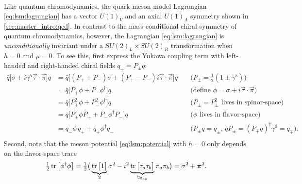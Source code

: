 Like quantum chromodynamics, the quark-meson model Lagrangian \eqref{eq:lsm:lagrangian} has a vector $U(1)_V$ and an axial $U(1)_A$ symmetry shown in \cref{sec:master_intro:qcd}.
In contrast to the mass-conditional chiral symmetry of quantum chromodynamics, however,
the Lagrangian \eqref{eq:lsm:lagrangian} is \emph{unconditionally} invariant under a $SU(2)_L \times SU(2)_R$ transformation when $h=0$ and $\mu = 0$.
To see this, first express the Yukawa coupling term with left-handed and right-handed chiral fields $q_\pm = P_\pm q$:
\begin{equation}
\begin{aligned}
	\bar{q} \big[\sigma + i \gamma^5 \vec{\tau} \cdot \vec{\pi}\big] q &= \bar{q} \big[ (P_+ + P_-) \sigma + (P_+ - P_-) i \vec{\tau} \cdot \vec{\pi}\big] q && \; \big( P_\pm = \tfrac{1}{2} (1 \pm \gamma^5) \big) \\
	                                                           &= \bar{q} \big[ P_+ \phi + P_- \phi^\dagger\big] q && \; \big( \text{define } \phi=\sigma+i\vec{\tau}\cdot\vec{\pi} \big) \\
	                                                           &= \bar{q} \big[ P_+^2 \phi + P_-^2 \phi^\dagger\big] q && \; \big( \text{$P_\pm=P_\pm^2$ lives in spinor-space} \big) \\
	                                                           &= \bar{q} \big[ P_+ \phi P_+ + P_- \phi^\dagger P_-\big] q && \; \big( \text{$\phi$ lives in flavor-space} \big)\\
	                                                           &= \bar{q}_- \phi \, q_+ + \bar{q}_+ \phi^\dagger q_- && \; \big( \text{$P_\pm q = q_\pm$, $\bar{q} P_\pm = (P_\mp q)^\dagger \gamma^0 = \bar{q}_\mp$} \big).\\
\end{aligned}
\label{eq:lsm:yukawa_symmetry}
\end{equation}
Second, note that the meson potential \eqref{eq:lsm:potential} with $h=0$ only depends on the flavor-space trace
\begin{equation}
	\tfrac12 \operatorname{tr}\big[\phi^\dagger \phi\big] = \tfrac12 \big( \underbrace{\operatorname{tr}\big[1\big]}_2 \sigma^2 - i^2 \underbrace{\operatorname{tr}\big[\tau_a \tau_b \big]}_{2 \delta_{ab}} \pi_a \pi_b \big) = \sigma^2 + {\bm{\pi}}^2.
\label{eq:lsm:meson_symmetry}
\end{equation}
